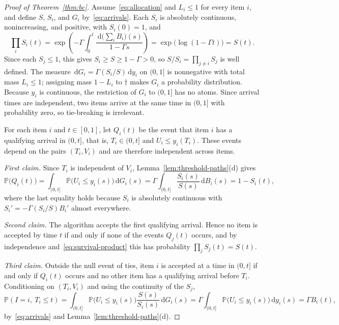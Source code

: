 \documentclass[11pt]{article}
\theoremstyle{definition}
\theoremstyle{remark}
\newcommand{\Pp}{\mathbb P}
\newcommand{\dd}{\,\mathrm d}
\begin{document}
\begin{proof}[Proof of Theorem~\ref{thm:bc}]
Assume~\eqref{eq:allocation} and $L_i\le1$ for every item $i$, and define $S$, $S_i$, and $G_i$ by~\eqref{eq:arrivals}.
Each $S_i$ is absolutely continuous, nonincreasing, and positive, with $S_i(0)=1$, and
\begin{equation}\label{eq:survival-product}
 \prod_iS_i(t)
 =\exp\!\left(-\Gamma\int_0^t\frac{\dd\bigl(\sum_iB_i\bigr)(s)}{1-\Gamma s}\right)
 =\exp\bigl(\log(1-\Gamma t)\bigr)
 =S(t).
\end{equation}
Since each $S_j\le1$, this gives $S_i\ge S\ge1-\Gamma>0$, so $S/S_i=\prod_{j\ne i}S_j$ is well defined.
The measure $\dd G_i=\Gamma(S_i/S)\dd y_i$ on $(0,1]$ is nonnegative with total mass $L_i\le1$; assigning mass $1-L_i$ to $\dagger$ makes $G_i$ a probability distribution.
Because $y_i$ is continuous, the restriction of $G_i$ to $(0,1]$ has no atoms.
Since arrival times are independent, two items arrive at the same time in $(0,1]$ with probability zero, so tie-breaking is irrelevant.

For each item $i$ and $t\in[0,1]$, let $Q_i(t)$ be the event that item $i$ has a qualifying arrival in $(0,t]$, that is, $T_i\in(0,t]$ and $U_i\le y_i(T_i)$.
These events depend on the pairs $(T_i,V_i)$ and are therefore independent across items.

\emph{First claim.}
Since $T_i$ is independent of $V_i$, Lemma~\ref{lem:threshold-paths}(d) gives
\[
 \Pp\bigl(Q_i(t)\bigr)
 =\int_{(0,t]}\Pp\bigl(U_i\le y_i(s)\bigr)\dd G_i(s)
 =\Gamma\int_{(0,t]}\frac{S_i(s)}{S(s)}\dd B_i(s)
 =1-S_i(t),
\]
where the last equality holds because $S_i$ is absolutely continuous with $S_i'=-\Gamma(S_i/S)B_i'$ almost everywhere.

\emph{Second claim.}
The algorithm accepts the first qualifying arrival.
Hence no item is accepted by time $t$ if and only if none of the events $Q_j(t)$ occurs, and by independence and~\eqref{eq:survival-product} this has probability $\prod_jS_j(t)=S(t)$.

\emph{Third claim.}
Outside the null event of ties, item $i$ is accepted at a time in $(0,t]$ if and only if $Q_i(t)$ occurs and no other item has a qualifying arrival before $T_i$.
Conditioning on $(T_i,V_i)$ and using the continuity of the $S_j$,
\[
 \Pp(I=i,\ T_i\le t)
 =\int_{(0,t]}\Pp\bigl(U_i\le y_i(s)\bigr)\frac{S(s)}{S_i(s)}\dd G_i(s)
 =\Gamma\int_{(0,t]}\Pp\bigl(U_i\le y_i(s)\bigr)\dd y_i(s)
 =\Gamma B_i(t),
\]
by~\eqref{eq:arrivals} and Lemma~\ref{lem:threshold-paths}(d).


\end{proof}
\end{document}
